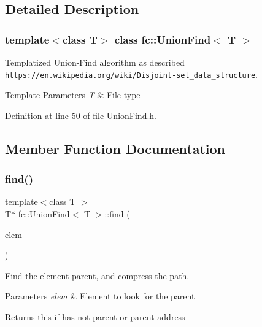 \subsection{Detailed Description}
\subsubsection*{template$<$class T$>$\newline
class fc\+::\+Union\+Find$<$ T $>$}

Templatized Union-\/\+Find algorithm as described \href{https://en.wikipedia.org/wiki/Disjoint-set_data_structure}{\tt https\+://en.\+wikipedia.\+org/wiki/\+Disjoint-\/set\+\_\+data\+\_\+structure}. 


\begin{DoxyTemplParams}{Template Parameters}
{\em T} & File type \\
\hline
\end{DoxyTemplParams}


Definition at line 50 of file Union\+Find.\+h.



\subsection{Member Function Documentation}
\mbox{\label{classfc_1_1UnionFind_afea42f5456053c1185991449afeedb01}} 
\subsubsection{\texorpdfstring{find()}{find()}}
{\footnotesize\ttfamily template$<$class T $>$ \\
T$\ast$ \hyperlink{classfc_1_1UnionFind}{fc\+::\+Union\+Find}$<$ T $>$\+::find (\begin{DoxyParamCaption}\item[{T $\ast$}]{elem }\end{DoxyParamCaption})\hspace{0.3cm}{\ttfamily [inline]}}



Find the element parent, and compress the path. 


\begin{DoxyParams}{Parameters}
{\em elem} & Element to look for the parent \\
\hline
\end{DoxyParams}
\begin{DoxyReturn}{Returns}
this if has not parent or parent address 
\end{DoxyReturn}


